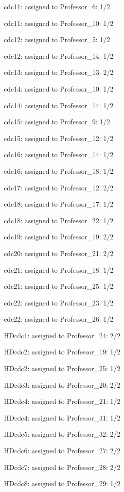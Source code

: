 \documentclass{article} %
\begin{document}
\noindent cdc11: assigned to Professor\_6: 1/2

\noindent cdc11: assigned to Professor\_10: 1/2

\noindent cdc12: assigned to Professor\_5: 1/2

\noindent cdc12: assigned to Professor\_14: 1/2

\noindent cdc13: assigned to Professor\_13: 2/2

\noindent cdc14: assigned to Professor\_10: 1/2

\noindent cdc14: assigned to Professor\_14: 1/2

\noindent cdc15: assigned to Professor\_9: 1/2

\noindent cdc15: assigned to Professor\_12: 1/2

\noindent cdc16: assigned to Professor\_14: 1/2

\noindent cdc16: assigned to Professor\_18: 1/2

\noindent cdc17: assigned to Professor\_12: 2/2

\noindent cdc18: assigned to Professor\_17: 1/2

\noindent cdc18: assigned to Professor\_22: 1/2

\noindent cdc19: assigned to Professor\_19: 2/2

\noindent cdc20: assigned to Professor\_21: 2/2

\noindent cdc21: assigned to Professor\_18: 1/2

\noindent cdc21: assigned to Professor\_25: 1/2

\noindent cdc22: assigned to Professor\_23: 1/2

\noindent cdc22: assigned to Professor\_26: 1/2

\noindent HDcdc1: assigned to Professor\_24: 2/2

\noindent HDcdc2: assigned to Professor\_19: 1/2

\noindent HDcdc2: assigned to Professor\_25: 1/2

\noindent HDcdc3: assigned to Professor\_20: 2/2

\noindent HDcdc4: assigned to Professor\_21: 1/2

\noindent HDcdc4: assigned to Professor\_31: 1/2

\noindent HDcdc5: assigned to Professor\_32: 2/2

\noindent HDcdc6: assigned to Professor\_27: 2/2

\noindent HDcdc7: assigned to Professor\_28: 2/2

\noindent HDcdc8: assigned to Professor\_29: 1/2
\end{document}
